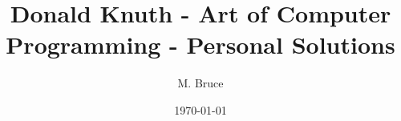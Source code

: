 \documentclass[a4paper,12pt]{book}
\begin{document}
\author{M. Bruce}
\title{Donald Knuth - Art of Computer Programming - Personal Solutions}
\date{\today}

\frontmatter
\maketitle
\tableofcontents

\mainmatter


\backmatter
\end{document}
